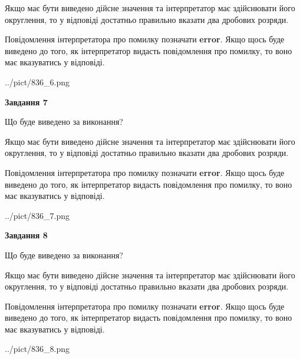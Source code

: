 \documentclass[12pt, ukrainian]{article}
\begin{document}
{\begin {Large}
Якщо має бути виведено дійсне значення та інтерпретатор має здійснювати його округлення, 
то у відповіді достатньо правильно вказати два дробових розряди.

Повідомлення інтерпретатора про помилку позначати \textbf{error}.
Якщо щось буде виведено до того, як інтерпретатор видасть повідомлення про помилку, 
то воно має вказуватись у відповіді. \par

\begin{center}
	{../pict/836_6.png}
\end{center}
\newpage

{\begin {center}\textbf{Завдання 7}\end {center}}\par
Що буде виведено за виконання? \par

Якщо має бути виведено дійсне значення та інтерпретатор має здійснювати його округлення, 
то у відповіді достатньо правильно вказати два дробових розряди.

Повідомлення інтерпретатора про помилку позначати \textbf{error}.
Якщо щось буде виведено до того, як інтерпретатор видасть повідомлення про помилку, 
то воно має вказуватись у відповіді. \par

\begin{center}
	{../pict/836_7.png}
\end{center}
\newpage

{\begin {center}\textbf{Завдання 8}\end {center}}\par
Що буде виведено за виконання? \par

Якщо має бути виведено дійсне значення та інтерпретатор має здійснювати його округлення, 
то у відповіді достатньо правильно вказати два дробових розряди.

Повідомлення інтерпретатора про помилку позначати \textbf{error}.
Якщо щось буде виведено до того, як інтерпретатор видасть повідомлення про помилку, 
то воно має вказуватись у відповіді. \par

\begin{center}
	{../pict/836_8.png}
\end{center}
\newpage


\end{Large}}
\end{document}
